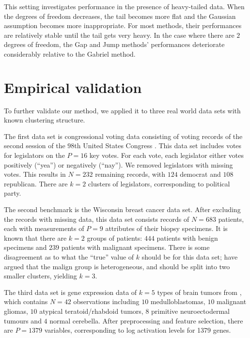 \documentclass[12pt]{article}
\begin{document}
This setting investigates performance in the presence of heavy-tailed data.
When the degrees of freedom decreases, the tail becomes more flat and the
Gaussian assumption becomes more inappropriate.  For most methods, their
performances are relatively stable until the tail gets very heavy. In the case
where there are $2$ degrees of freedom, the Gap and Jump methods' performances
deteriorate considerably relative to the Gabriel method.


\section{Empirical validation}
\label{sec:empirical-validation}

To further validate our method, we applied it to three real world data sets
with known clustering structure.


The first data set is congressional voting data consisting of voting records
of the second session of the $98$th United States Congress
\citep{schlimmer1987concept}.  This data set includes votes for legislators on
the $P = 16$ key votes.  For each vote, each legislator either votes
positively (``yea'') or negatively (``nay''). We removed legislators with missing
votes.  This results in $N = 232$ remaining records, with $124$ democrat and
$108$ republican. There are $k = 2$ clusters of legislators, corresponding to
political party.


The second benchmark is the \citet{mangasarian1990pattern} Wisconsin breast
cancer data set.  After excluding the records with missing data, this data set
consists records of $N = 683$ patients, each with measurements of $P = 9$
attributes of their biopsy specimens. It is known that there are $k = 2$
groups of patients: $444$ patients with benign specimens and $239$ patients
with malignant specimens. There is some disagreement as to what the ``true''
value of $k$ should be for this data set; \citet{fujita2014non} have argued
that the malign group is heterogeneous, and should be split into two smaller
clusters, yielding $k = 3$.


The third data set is gene expression data of $k = 5$ types of brain tumors
from \citet{pomeroy2002prediction}, which contains $N = 42$ observations
including $10$ medulloblastomas, $10$ malignant gliomas, $10$ atypical
teratoid/rhabdoid tumors, $8$ primitive neuroectodermal tumours and $4$ normal
cerebella. After preprocessing and feature selection, there are $P = 1379$
variables, corresponding to log activation levels for 1379 genes.
\end{document}
